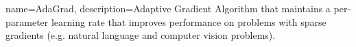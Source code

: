 {
	name=AdaGrad,
	description={Adaptive Gradient Algorithm that maintains a per-parameter learning rate that improves performance on problems with sparse gradients (e.g. natural language and computer vision problems).}
}

